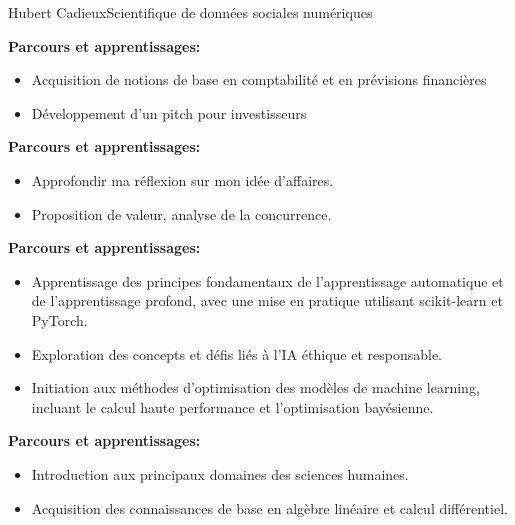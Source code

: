 \documentclass{article}
\begin{document}
\begin{cv}[avatar]{Hubert Cadieux}{Scientifique de données sociales numériques}
\begin{cvevent}[2024]
    \textbf{Parcours et apprentissages:}
    \begin{itemize}
        \item Acquisition de notions de base en comptabilité et en prévisions financières
        \item Développement d'un pitch pour investisseurs\\[10pt]
    \end{itemize}
\end{cvevent}

\begin{cvevent}[2024]
    \textbf{Parcours et apprentissages:}
    \begin{itemize}
        \item Approfondir ma réflexion sur mon idée d'affaires.
        \item Proposition de valeur, analyse de la concurrence.\\[10pt]
    \end{itemize}
\end{cvevent}

\begin{cvevent}[2023]
    \textbf{Parcours et apprentissages:}
    \begin{itemize}
        \item Apprentissage des principes fondamentaux de l'apprentissage automatique et de l'apprentissage profond, avec une mise en pratique utilisant scikit-learn et PyTorch.
        \item Exploration des concepts et défis liés à l'IA éthique et responsable.
        \item Initiation aux méthodes d'optimisation des modèles de machine learning, incluant le calcul haute performance et l'optimisation bayésienne.\\[10pt]
    \end{itemize}
\end{cvevent}

\begin{cvevent}[2017][2020]
    \textbf{Parcours et apprentissages:}
    \begin{itemize}
        \item Introduction aux principaux domaines des sciences humaines.
        \item Acquisition des connaissances de base en algèbre linéaire et calcul différentiel.\\[10pt]
    \end{itemize}
\end{cvevent}




\end{cv}
\end{document}
